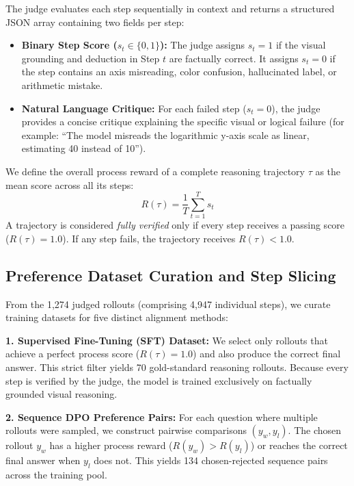 \documentclass[11pt]{article}
\begin{document}
The judge evaluates each step sequentially in context and returns a structured JSON array containing two fields per step:
\begin{itemize}[noitemsep,topsep=0pt]
    \item \textbf{Binary Step Score ($s_t \in \{0, 1\}$):} The judge assigns $s_t = 1$ if the visual grounding and deduction in Step $t$ are factually correct. It assigns $s_t = 0$ if the step contains an axis misreading, color confusion, hallucinated label, or arithmetic mistake.
    \item \textbf{Natural Language Critique:} For each failed step ($s_t = 0$), the judge provides a concise critique explaining the specific visual or logical failure (for example: ``The model misreads the logarithmic y-axis scale as linear, estimating 40 instead of 10'').
\end{itemize}

We define the overall process reward of a complete reasoning trajectory $\tau$ as the mean score across all its steps:
\begin{equation}
    R(\tau) = \frac{1}{T} \sum_{t=1}^T s_t
    \label{eq:process_reward}
\end{equation}
A trajectory is considered \textit{fully verified} only if every step receives a passing score ($R(\tau) = 1.0$). If any step fails, the trajectory receives $R(\tau) < 1.0$.

\subsection{Preference Dataset Curation and Step Slicing}
\label{subsec:dataset_curation}
From the 1,274 judged rollouts (comprising 4,947 individual steps), we curate training datasets for five distinct alignment methods:

\textbf{1. Supervised Fine-Tuning (SFT) Dataset:} We select only rollouts that achieve a perfect process score ($R(\tau) = 1.0$) and also produce the correct final answer. This strict filter yields 70 gold-standard reasoning rollouts. Because every step is verified by the judge, the model is trained exclusively on factually grounded visual reasoning.

\textbf{2. Sequence DPO Preference Pairs:} For each question where multiple rollouts were sampled, we construct pairwise comparisons $(y_w, y_l)$. The chosen rollout $y_w$ has a higher process reward ($R(y_w) > R(y_l)$) or reaches the correct final answer when $y_l$ does not. This yields 134 chosen-rejected sequence pairs across the training pool.
\end{document}
